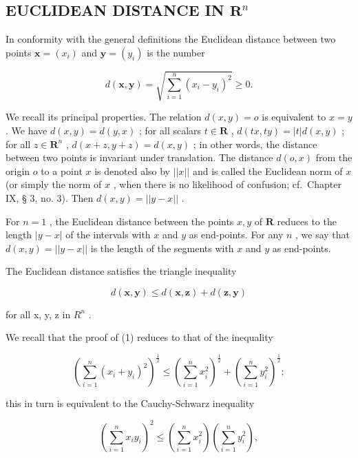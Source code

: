 \subsection{\texorpdfstring{EUCLIDEAN DISTANCE IN \(\mathbf{R}^n\)}{EUCLIDEAN DISTANCE IN R TO THE N}}

In conformity with the general definitions the Euclidean distance between two points \(\boldsymbol{x} = (x_{i})\) and \(\boldsymbol{y} = (y_{i})\) is the number

\[
d (\boldsymbol {x}, \boldsymbol {y}) = \sqrt {\sum_ {i = 1} ^ {n} (x _ {i} - y _ {i}) ^ {2}} \geqslant 0.
\]

We recall its principal properties. The relation \(d(x, y) = o\) is equivalent to \(x = y\) . We have \(d(x, y) = d(y, x)\) ; for all scalars \(t \in \mathbf{R}\) , \(d(tx, ty) = |t|d(x, y)\) ; for all \(z \in \mathbf{R}^n\) , \(d(x + z, y + z) = d(x, y)\) ; in other words, the distance between two points is invariant under translation. The distance \(d(o, x)\) from the origin \(o\) to a point \(x\) is denoted also by \(||x||\) and is called the Euclidean norm of \(x\) (or simply the norm of \(x\) , when there is no likelihood of confusion; cf.~Chapter IX, § 3, no. 3). Then \(d(x, y) = ||y - x||\) .

For \(n = 1\) , the Euclidean distance between the points \(x, y\) of \(\mathbf{R}\) reduces to the length \(|y - x|\) of the intervals with \(x\) and \(y\) as end-points. For any \(n\) , we say that \(d(x, y) = ||y - x||\) is the length of the segments with \(x\) and \(y\) as end-points.

The Euclidean distance satisfies the triangle inequality

\[
d (\boldsymbol {x}, \boldsymbol {y}) \leqslant d (\boldsymbol {x}, \boldsymbol {z}) + d (\boldsymbol {z}, \boldsymbol {y})\tag{1}
\]

for all x, y, z in \(R^{n}\) .

We recall that the proof of (1) reduces to that of the inequality

\[
\left(\sum_ {i = 1} ^ {n} \left(x _ {i} + y _ {i}\right) ^ {2}\right) ^ {\frac {1}{2}} \leqslant \left(\sum_ {i = 1} ^ {n} x _ {i} ^ {2}\right) ^ {\frac {1}{2}} + \left(\sum_ {i = 1} ^ {n} y _ {i} ^ {2}\right) ^ {\frac {1}{2}};
\]

this in turn is equivalent to the Cauchy-Schwarz inequality

\[
\left(\sum_ {i = 1} ^ {n} x _ {i} y _ {i}\right) ^ {2} \leqslant \left(\sum_ {i = 1} ^ {n} x _ {i} ^ {2}\right) \left(\sum_ {i = 1} ^ {n} y _ {i} ^ {2}\right),
\]

